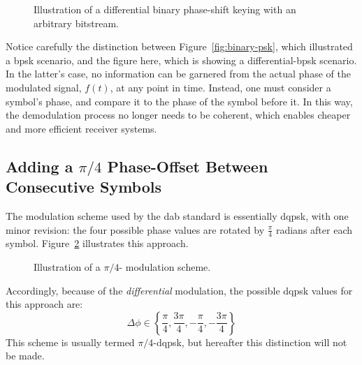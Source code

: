 \documentclass[class=report,11pt,crop=false]{standalone}
\begin{document}
\begin{figure}[htbp]
    \centering
    \captionsetup{type=figure}
    \def\svgwidth{1\linewidth}
    {\scriptsize
        }
    \caption{Illustration of a differential binary phase-shift keying with an arbitrary bitstream.}
    \label{fig:differential-binary-psk}
\end{figure}

Notice carefully the distinction between Figure~\ref{fig:binary-psk}, which illustrated a \gls{bpsk} scenario, and the figure here, which is showing a differential-\gls{bpsk} scenario. In the latter's case, no information can be garnered from the actual phase of the modulated signal, \(f(t)\), at any point in time. Instead, one must consider a symbol's phase, and compare it to the phase of the symbol before it. In this way, the demodulation process no longer needs to be coherent, which enables cheaper and more efficient receiver systems.

\subsection{Adding a $\pi/4$ Phase-Offset Between Consecutive Symbols}
The modulation scheme used by the \gls{dab} standard is essentially \gls{dqpsk}, with one minor revision: the four possible phase values are rotated by \(\frac{\pi}{4}\) radians after each symbol. Figure~\ref{fig:pi-by-4-dqpsk-illustration} illustrates this approach.

\begin{figure}[htbp]
    \centering
    \captionsetup{type=figure}
    \def\svgwidth{1\linewidth}
    { %
    \scriptsize
    }
    \caption{Illustration of a \(\pi/4\)- modulation scheme.}
    \label{fig:pi-by-4-dqpsk-illustration}
\end{figure}

Accordingly, because of the \emph{differential} modulation, the possible \gls{dqpsk} values for this approach are:
\begin{equation}
    \Delta\phi \in \left\{ \frac{\pi}{4}, \frac{3\pi}{4}, -\frac{\pi}{4}, -\frac{3\pi}{4} \right\}
\end{equation}
This scheme is usually termed \(\pi/4\)-\gls{dqpsk}, but hereafter this distinction will not be made.

\end{document}
